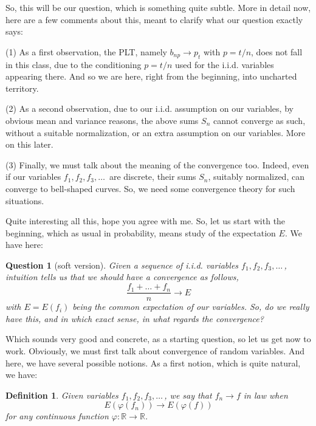 \documentclass[12pt]{amsbook}
\newtheorem{definition}[theorem]{Definition}
\newtheorem{question}[theorem]{Question}
\begin{document}
So, this will be our question, which is something quite subtle. More in detail now, here are a few comments about this, meant to clarify what our question exactly says:

\bigskip

(1) As a first observation, the PLT, namely $b_{np}\to p_t$ with $p=t/n$, does not fall in this class, due to the conditioning $p=t/n$ used for the i.i.d. variables appearing there. And so we are here, right from the beginning, into uncharted territory.

\bigskip

(2) As a second observation, due to our i.i.d. assumption on our variables, by obvious mean and variance reasons, the above sums $S_n$ cannot converge as such, without a suitable normalization, or an extra assumption on our variables. More on this later.

\bigskip

(3) Finally, we must talk about the meaning of the convergence too. Indeed, even if our variables $f_1,f_2,f_3,\ldots\,$ are discrete, their sums $S_n$, suitably normalized, can converge to bell-shaped curves. So, we need some convergence theory for such situations.

\bigskip

Quite interesting all this, hope you agree with me. So, let us start with the beginning, which as usual in probability, means study of the expectation $E$. We have here:

\begin{question}[soft version]
Given a sequence of i.i.d. variables $f_1,f_2,f_3,\ldots\,$, intuition tells us that we should have a convergence as follows,
$$\frac{f_1+\ldots+f_n}{n}\to E$$
 with $E=E(f_i)$ being the common expectation of our variables. So, do we really have this, and in which exact sense, in what regards the convergence?
\end{question}

Which sounds very good and concrete, as a starting question, so let us get now to work. Obviously, we must first talk about convergence of random variables. And here, we have several possible notions. As a first notion, which is quite natural, we have:


\begin{definition}
Given variables $f_1,f_2,f_3,\ldots\,$, we say that $f_n\to f$ in law when 
$$E(\varphi(f_n))\to E(\varphi(f))$$
for any continuous function $\varphi:\mathbb R\to\mathbb R$.
\end{definition}
\end{document}
